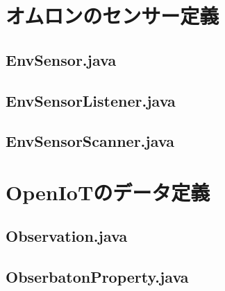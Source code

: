 \documentclass{kuisthesis}			%
\begin{document}
\section{オムロンのセンサー定義}
\subsection{EnvSensor.java}


\subsection{EnvSensorListener.java}


\subsection{EnvSensorScanner.java}


\section{OpenIoTのデータ定義}
\subsection{Observation.java}


\subsection{ObserbatonProperty.java}

\end{document}
